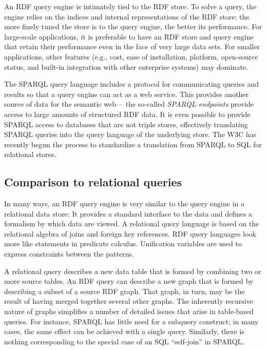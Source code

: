 An RDF query engine is intimately tied to the RDF store. To solve a
query, the engine relies on the indices and internal representations of
the RDF store: the more finely tuned the store is to the query engine,
the better its performance. For large-scale applications, it is
preferable to have an RDF store and query engine that retain their
performance even in the face of very large data sets. For smaller
applications, other features (e.g., cost, ease of installation,
platform, open-source status, and built-in integration with other
enterprise systems) may dominate.

The SPARQL query language includes a protocol for communicating queries
and results so that a query engine can act as a web service. This
provides another source of data for the semantic web--- the so-called
\emph{SPARQL endpoints} provide access to large amounts of structured
RDF data. It is even possible to provide SPARQL access to databases that
are not triple stores, effectively translating SPARQL queries into the
query language of the underlying store. The W3C has recently begun the
process to standardize a translation from SPARQL to SQL for relational
stores.

\subsection{Comparison to relational queries}

In many ways, an RDF query engine is very similar to the query engine in
a relational data store: It provides a standard interface to the data
and defines a formalism by which data are viewed. A relational query
language is based on the relational algebra of joins and foreign key
references. RDF query languages look more like statements in predicate
calculus. Unification variables are used to express constraints between
the patterns.

A relational query describes a new data table that is formed by
combining two or more source tables. An RDF query can describe a new
graph that is formed by describing a subset of a source RDF graph. That
graph, in turn, may be the result of having merged together several
other graphs. The inherently recursive nature of graphs simplifies a
number of detailed issues that arise in table-based queries. For
instance, SPARQL has little need for a subquery construct; in many
cases, the same effect can be achieved with a single query. Similarly,
there is nothing corresponding to the special case of an SQL
``self-join'' in SPARQL.

